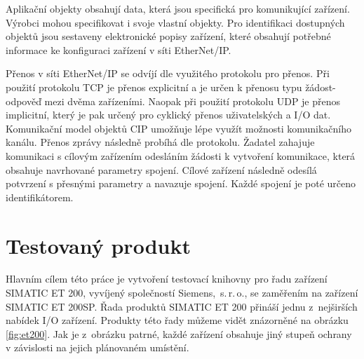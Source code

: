 Aplikační objekty obsahují data, která jsou specifická pro komunikující zařízení. Výrobci mohou specifikovat i svoje vlastní objekty. Pro identifikaci dostupných objektů jsou sestaveny elektronické popisy zařízení, které obsahují potřebné informace ke konfiguraci zařízení v síti EtherNet/IP. 

Přenos v síti EtherNet/IP se odvíjí dle využitého protokolu pro přenos. Při použití protokolu TCP je přenos explicitní a je určen k přenosu typu žádost-odpověď mezi dvěma zařízeními. Naopak při použití protokolu UDP je přenos implicitní, který je pak určený pro cyklický přenos uživatelských a I/O dat. Komunikační model objektů CIP umožňuje lépe využít možnosti komunikačního kanálu. Přenos zprávy následně probíhá dle protokolu. Žadatel zahajuje komunikaci s cílovým zařízením odesláním žádosti k vytvoření komunikace, která obsahuje navrhované parametry spojení. Cílové zařízení následně odesílá potvrzení s přesnými parametry a navazuje spojení. Každé spojení je poté určeno identifikátorem. \cite{ethernet_ip}

\section{Testovaný produkt}

Hlavním cílem této práce je vytvoření testovací knihovny pro řadu zařízení SIMATIC ET 200, vyvíjený společností Siemens,~s.\,{}r.\,{}o., se zaměřením na zařízení SIMATIC ET 200SP. Řada produktů SIMATIC ET 200 přináší jednu z~nejširších nabídek I/O zařízení. Produkty této řady můžeme vidět znázorněné na obrázku \ref{fig:et200}. Jak je z~obrázku patrné, každé zařízení obsahuje jiný stupeň ochrany v závislosti na jejich plánovaném umístění. \cite{et200} 

